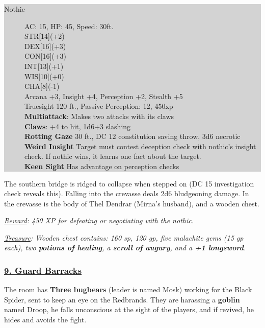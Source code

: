 \colorbox{lightgray}{\begin{minipage}{0.4\textwidth}
		\begin{description}
			\item[Nothic]
			AC: 15, HP: 45, Speed: 30ft.
			\\ STR[14](+2) 
			\\ DEX[16](+3)
			\\ CON[16](+3)
			\\ INT[13](+1)
			\\ WIS[10](+0)
			\\ CHA[8](-1)
			\\ Arcana +3, Insight +4, Perception +2, Stealth +5
			\\ Truesight 120 ft., Passive Perception: 12, 450xp
			\\ \textbf{Multiattack}: Makes two attacks with its claws
			\\ \textbf{Claws}: +4 to hit, 1d6+3 slashing
			\\ \textbf{Rotting Gaze} 30 ft., DC 12 constitution saving throw, 3d6 necrotic
			\\ \textbf{Weird Insight} Target must contest deception check with nothic's insight check. If nothic wins, it learns one fact about the target.
			\\ \textbf{Keen Sight} Has advantage on perception checks 
		\end{description}
\end{minipage}}
\break

The southern bridge is ridged to collapse when stepped on (DC 15 investigation check reveals this). Falling into the crevasse deals 2d6 bludgeoning damage. In the crevasse is the body of Thel Dendrar (Mirna's husband), and a wooden chest. 

\emph{\underline{Reward}: 450 XP for defeating or negotiating with the nothic.}

\emph{\underline{Treasure}: Wooden chest contains: 160 sp, 120 gp, five malachite gems (15 gp each), two \textbf{potions of healing}, a \textbf{scroll of augury}, and a \textbf{+1 longsword}.}

\subsubsection*{\underline{9. Guard Barracks}}
The room has \textbf{Three bugbears} (leader is named Mosk) working for the Black Spider, sent to keep an eye on the Redbrands. They are harassing a \textbf{goblin} named Droop, he falls unconscious at the sight of the players, and if revived, he hides and avoids the fight.

